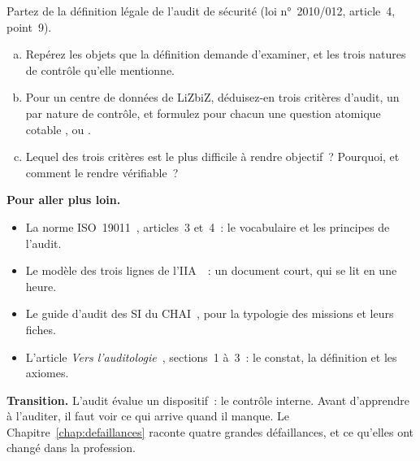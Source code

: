 \begin{boxexo}[title={\ding{45}\quad Exercice~1.10. De la loi aux critères \niveauexpert}]
Partez de la définition légale de l'audit de sécurité (loi n°~2010/012,
article~4, point~9).
\begin{enumerate}[(a)]
    \item Repérez les objets que la définition demande d'examiner, et les
          trois natures de contrôle qu'elle mentionne.
    \item Pour un centre de données de LiZbiZ, déduisez-en trois critères
          d'audit, un par nature de contrôle, et formulez pour chacun une
          question atomique cotable \OUI{}, \NON{} ou \NEK{}.
    \item Lequel des trois critères est le plus difficile à rendre
          objectif~? Pourquoi, et comment le rendre vérifiable~?
\end{enumerate}
\end{boxexo}

\bigskip

\begin{boxinfo}
\textbf{Pour aller plus loin.}
\begin{itemize}
    \item La norme ISO~19011~\cite{iso19011_2018}, articles~3 et~4~: le
          vocabulaire et les principes de l'audit.
    \item Le modèle des trois lignes de l'IIA~\cite{iia2020troislignes}~:
          un document court, qui se lit en une heure.
    \item Le guide d'audit des SI du CHAI~\cite{chai2014guide}, pour la
          typologie des missions et leurs fiches.
    \item L'article \emph{Vers l'auditologie}~\cite{minka2026auditologie},
          sections~1 à~3~: le constat, la définition et les axiomes.
\end{itemize}
\end{boxinfo}

\begin{boxinfo}
\textbf{Transition.} L'audit évalue un dispositif~: le contrôle interne.
Avant d'apprendre à l'auditer, il faut voir ce qui arrive quand il manque.
Le Chapitre~\ref{chap:defaillances} raconte quatre grandes défaillances, et
ce qu'elles ont changé dans la profession.
\end{boxinfo}
